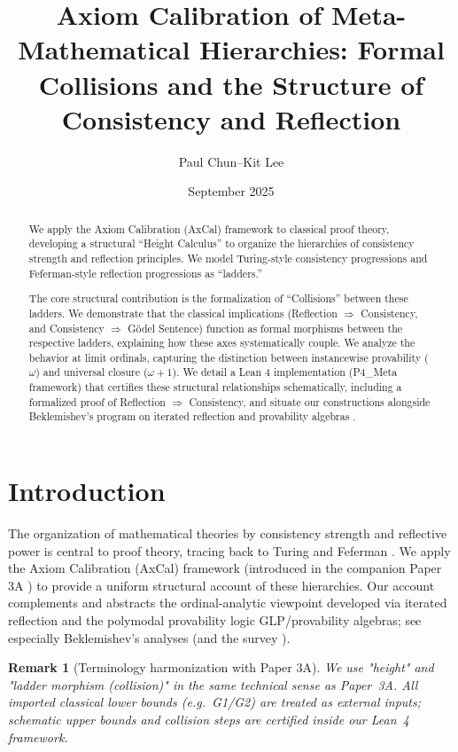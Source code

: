 \documentclass[11pt]{article}
\title{Axiom Calibration of Meta-Mathematical Hierarchies: Formal Collisions and the Structure of Consistency and Reflection}
\author{Paul Chun--Kit Lee}
\date{September 2025}
\newtheorem{remark}[theorem]{Remark}
\begin{document}
\maketitle

\begin{abstract}
We apply the Axiom Calibration (AxCal) framework to classical proof theory, developing a structural ``Height Calculus'' to organize the hierarchies of consistency strength and reflection principles. We model Turing-style consistency progressions and Feferman-style reflection progressions as ``ladders.''

The core structural contribution is the formalization of ``Collisions'' between these ladders. We demonstrate that the classical implications (Reflection $\Rightarrow$ Consistency, and Consistency $\Rightarrow$ Gödel Sentence) function as formal morphisms between the respective ladders, explaining how these axes systematically couple. We analyze the behavior at limit ordinals, capturing the distinction between instancewise provability ($\omega$) and universal closure ($\omega+1$). We detail a Lean 4 implementation (P4\_Meta framework) that certifies these structural relationships schematically, including a formalized proof of Reflection $\Rightarrow$ Consistency, and situate our constructions alongside Beklemishev’s program on iterated reflection and provability algebras \cite{Beklemishev2003,Beklemishev2004}.
\end{abstract}

\tableofcontents

\section{Introduction}
The organization of mathematical theories by consistency strength and reflective power is central to proof theory, tracing back to Turing \cite{Turing1939} and Feferman \cite{Feferman1962}. We apply the Axiom Calibration (AxCal) framework (introduced in the companion Paper 3A \cite{Paper3a}) to provide a uniform structural account of these hierarchies.
Our account complements and abstracts the ordinal-analytic viewpoint developed via iterated reflection and the polymodal provability logic GLP/provability algebras; see especially Beklemishev's analyses \cite{Beklemishev2003,Beklemishev2004} (and the survey \cite{ArtemovBeklemishev2004}).

\begin{remark}[Terminology harmonization with Paper 3A]
We use "height" and "ladder morphism (collision)" in the same technical sense as Paper~3A.
All imported classical lower bounds (e.g.\ G1/G2) are treated as external inputs; schematic upper bounds
and collision steps are certified inside our Lean~4 framework.
\end{remark}
\end{document}
